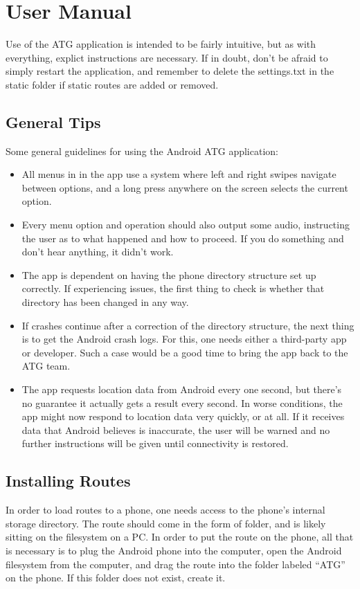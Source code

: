 \section{User Manual}
Use of the ATG application is intended to be fairly intuitive, but as with everything, explict instructions are necessary. If in doubt, don't 
be afraid to simply restart the application, and remember to delete the settings.txt in the static folder if static routes are added or
removed.
\subsection{General Tips}
Some general guidelines for using the Android ATG application:
\begin{itemize}
\item{All menus in in the app use a system where left and right swipes navigate between options, and a long press anywhere on the screen
selects the current option.}
\item{Every menu option and operation should also output some audio, instructing the user as to what happened and how to proceed. If you do
something and don't hear anything, it didn't work.}
\item{The app is dependent on having the phone directory structure set up correctly. If experiencing issues, the first thing to check is
whether that directory has been changed in any way.}
\item{If crashes continue after a correction of the directory structure, the next thing is to get the Android crash logs. For this, one
needs either a third-party app or developer. Such a case would be a good time to bring the app back to the ATG team.}
\item{The app requests location data from Android every one second, but there's no guarantee it actually gets a result every second. In worse
conditions, the app might now respond to location data very quickly, or at all. If it receives data that Android believes is inaccurate, the
user will be warned and no further instructions will be given until connectivity is restored.}
\end{itemize}
\subsection{Installing Routes}
In order to load routes to a phone, one needs access to the phone's internal storage directory. The route should come in the form of folder,
and is likely sitting on the filesystem on a PC. In order to put the route on the phone, all that is necessary is to plug the Android phone 
into the computer, open the Android filesystem from the computer, and drag the route into the folder labeled ``ATG'' on the phone. If this
folder does not exist, create it.

